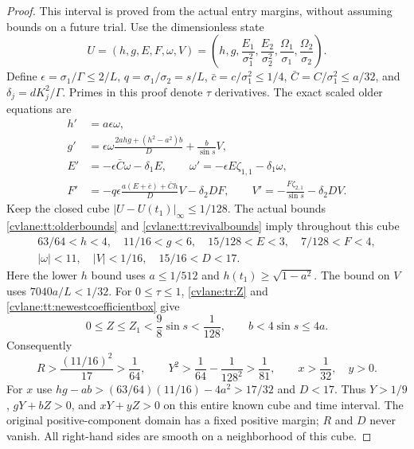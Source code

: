\begin{proof}
This interval is proved from the actual entry margins, without
assuming bounds on a future trial. Use the dimensionless state
\[
 U=(h,g,E,F,\omega,V)
  =\left(h,g,\frac{E_1}{\sigma_1^2},
       \frac{E_2}{\sigma_2^2},
       \frac{\Omega_1}{\sigma_1},
       \frac{\Omega_2}{\sigma_2}\right).
\]
Define $\epsilon=\sigma_1/\Gamma\leq2/L$,
$q=\sigma_1/\sigma_2=s/L$, $\bar c=c/\sigma_1^2\leq1/4$,
$\bar C=C/\sigma_1^2\leq a/32$, and
$\delta_j=dK_j^2/\Gamma$. Primes in this proof denote $\tau$
derivatives. The exact scaled older equations are
\begin{equation}\label{cvlane:tr:scaled}
 \begin{aligned}
 h'&=a\epsilon\omega,\\
 g'&=\epsilon\omega\frac{2ahg+(h^2-a^2)b}{D}
                          +\frac b{\sin s}V,\\
 E'&=-\epsilon\bar C\omega-\delta_1E,\qquad
 \omega'=-\epsilon E\zeta_{1,1}-\delta_1\omega,\\
 F'&=-q\epsilon\frac{a(E+\bar c)+\bar Ch}{D}V-\delta_2DF,
 \qquad
 V'=-\frac{F\zeta_{2,1}}{\sin s}-\delta_2DV.
 \end{aligned}
\end{equation}
Keep the closed cube $|U-U(t_1)|_\infty\leq1/128$.
The actual bounds \eqref{cvlane:tt:olderbounds} and
\eqref{cvlane:tt:revivalbounds} imply throughout this cube
\[
 \begin{gathered}
 63/64<h<4,\quad 11/16<g<6,\quad
 15/128<E<3,\quad 7/128<F<4,\\
 |\omega|<11,\quad |V|<1/16,\quad
 15/16<D<17.
 \end{gathered}
\]
Here the lower $h$ bound uses $a\leq1/512$ and
$h(t_1)\geq\sqrt{1-a^2}$. The bound on $V$ uses
$7040a/L<1/32$. For $0\leq\tau\leq1$,
\eqref{cvlane:tr:Z} and \eqref{cvlane:tt:newestcoefficientbox} give
\[
 0\leq Z\leq Z_1<\frac98\sin s<\frac1{128},
 \qquad b<4\sin s\leq4a.
\]
Consequently
\[
 R>\frac{(11/16)^2}{17}>\frac1{64},\qquad
 Y^2>\frac1{64}-\frac1{128^2}>\frac1{81},
 \qquad x>\frac1{32},\quad y>0.
\]
For $x$ use
$hg-ab>(63/64)(11/16)-4a^2>17/32$ and $D<17$.
Thus $Y>1/9$, $gY+bZ>0$, and $xY+yZ>0$ on this entire
known cube and time interval. The original positive-component
domain has a fixed positive margin; $R$ and $D$ never vanish.
All right-hand sides are smooth on a neighborhood of this cube.


\end{proof}
